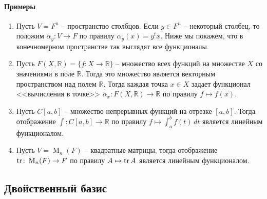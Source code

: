 \paragraph{Примеры}
\begin{enumerate}
\item Пусть $V = F^n$ -- пространство столбцов. Если $y\in F^n$ -- некоторый столбец, то положим $\alpha_y \colon V\to F$ по правилу $\alpha_y(x) = y^t x$. Ниже мы покажем, что в конечномерном пространстве так выглядят все функционалы.

\item Пусть $F(X, \mathbb R) = \{f\colon X\to \mathbb R\}$ -- множество всех функций на множестве $X$ со значениями в поле $\mathbb R$. Тогда это множество является векторным пространством над полем $\mathbb R$. Тогда каждая точка $x\in X$ задает функционал <<вычисления в точке>> $\alpha_x \colon F(X,\mathbb R)\to \mathbb R$ по правилу $f\mapsto f(x)$.

\item Пусть $C[a,b]$ -- множество непрерывных функций на отрезке $[a,b]$. Тогда отображение $\int \colon C[a,b]\to \mathbb R$ по правилу $f \mapsto \int_a^b f(t)\,dt$ является линейным функционалом.

\item Пусть $V = \operatorname{M}_n(F)$ -- квадратные матрицы, тогда отображение $\operatorname{tr}\colon \operatorname{M}_n(F)\to F$ по правилу $A\mapsto \operatorname{tr} A$ является линейным функционалом.

\end{enumerate}




\subsection{Двойственный базис}

